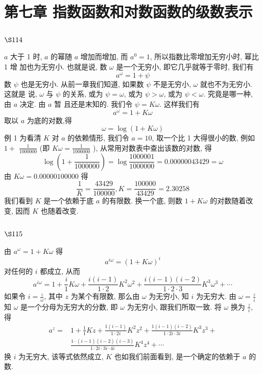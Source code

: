 \chapter{第七章 指数函数和对数函数的级数表示}

\section{$\S 114$}

$a$ 大于 1 时, $a$ 的幂随 $a$ 增加而增加, 而 $a^{0}=1$, 所以指数比零增加无穷小时, 幂比 1 增 加也为无穷小. 也就是说, 数 $\omega$ 是一个无穷小, 即它几乎就等于零时, 我们有
\[
a^{\omega}=1+\psi
\]
数 $\psi$ 也是无穷小. 从前一章我们知道, 如果数 $\psi$ 不是无穷小, $\omega$ 就也不为无穷小. 这就是 说, $\omega$ 与 $\psi$ 的关系, 或为 $\psi=\omega$, 或为 $\psi>\omega$, 或为 $\psi<\omega$. 究竟是哪一种, 由 $a$ 决定. 由 $a$ 暂 且还是末知的. 我们令 $\psi=K \omega$. 这样我们有
\[
a^{\omega}=1+K \omega
\]
取以 $a$ 为底的对数,得
\[
\omega=\log (1+K \omega)
\]
例 1 为看清 $K$ 对 $a$ 的依赖情形, 我们令 $a=10$, 取一个比 1 大得很小的数, 例如 $1+$ $\frac{1}{1000000}$ (即 $K \omega=\frac{1}{1000000}$ ), 从常用对数表中查出该数的对数, 得
\[
\log \left(1+\frac{1}{1000000}\right)=\log \frac{1000001}{1000000}=0.00000043429=\omega
\]
由 $K \omega=0.00000100000$ 得
\[
\frac{1}{K}=\frac{43429}{100000}, K=\frac{100000}{43429}=2.30258
\]
我们看到 $K$ 是一个依赖于底 $a$ 的有限数. 换一个底, 则数 $1+K \omega$ 的对数随着改变, 因而 $K$ 也随着改变.

\section{$\S 115$}

由 $a^{\omega}=1+K \omega$ 得
\[
a^{i \omega}=(1+K \omega)^{i}
\]
对任何的 $i$ 都成立, 从而
\[
a^{i \omega}=1+\frac{i}{1} K \omega+\frac{i(i-1)}{1 \cdot 2} K^{2} \omega^{2}+\frac{i(i-1)(i-2)}{1 \cdot 2 \cdot 3} K^{3} \omega^{3}+\cdots
\]
如果令 $i=\frac{z}{\omega}$, 其中 $z$ 为某个有限数, 那么由 $\omega$ 为无穷小, 知 $i$ 为无穷大. 由 $\omega=\frac{z}{i}$ 知 $\omega$ 是一个分母为无穷大的分数, 即 $\omega$ 为无穷小, 跟我们所取一致. 将 $\omega$ 换为 $\frac{z}{i}$, 得
\[
\begin{aligned}
a^{z}= & 1+\frac{1}{1} K z+\frac{1(i-1)}{1 \cdot 2 i} K^{2} z^{2}+\frac{1(i-1)(i-2)}{1 \cdot 2 i \cdot 3 i} K^{3} z^{3}+ \\
& \frac{1 \cdot(i-1)(i-2)(i-3)}{1 \cdot 2 i \cdot 3 i \cdot 4 i} K^{4} z^{4}+\cdots
\end{aligned}
\]
换 $i$ 为无穷大, 该等式依然成立, $K$ 也如我们前面看到, 是一个确定的依赖于 $a$ 的数.

